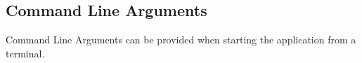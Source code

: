 \subsection{Command Line Arguments}
Command Line Arguments can be provided when starting the application from a terminal. 
